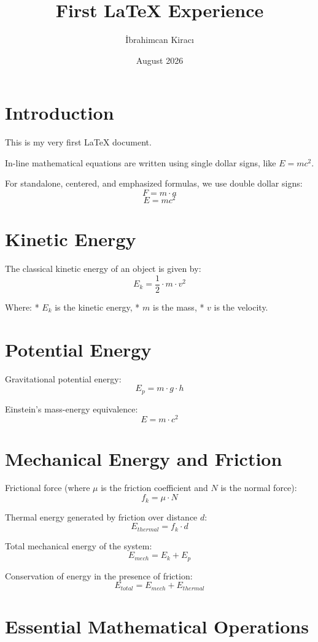 \documentclass{article}
\title{First LaTeX Experience}
\author{İbrahimcan Kiracı}
\date{August 2026}
\begin{document}
\maketitle

\section{Introduction}
This is my very first LaTeX document.

In-line mathematical equations are written using single dollar signs, like $E = mc^2$.

For standalone, centered, and emphasized formulas, we use double dollar signs:
$$F = m \cdot a$$
$$E = mc^2$$

\section{Kinetic Energy}

The classical kinetic energy of an object is given by:
$$E_k = \frac{1}{2} \cdot m \cdot v^2$$

Where:
* $E_k$ is the kinetic energy,
* $m$ is the mass,
* $v$ is the velocity.

\section{Potential Energy}

Gravitational potential energy:
$$E_p = m \cdot g \cdot h$$

Einstein's mass-energy equivalence:
$$E = m \cdot c^2$$

\section{Mechanical Energy and Friction}

Frictional force (where $\mu$ is the friction coefficient and $N$ is the normal force):
$$f_k = \mu \cdot N$$

Thermal energy generated by friction over distance $d$:
$$E_{thermal} = f_k \cdot d$$

Total mechanical energy of the system:
$$E_{mech} = E_k + E_p$$

Conservation of energy in the presence of friction:
$$E_{total} = E_{mech} + E_{thermal}$$

\section{Essential Mathematical Operations}
\end{document}
